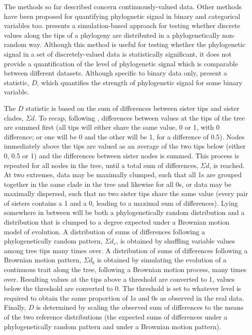 The methods so far described concern continuously-valued data. Other methods have been proposed for quantifying phylognetic signal in binary and categorical variables too. \textcite{abouheif_method_1999} presents a simulation-based approach for testing whether discrete values along the tips of a phylogeny are distributed in a phylogenetically non-random way. Although this method is useful for testing whether the phylogenetic signal in a set of discretely-valued data is statistically significant, it does not provide a quantification of the level of phylogenetic signal which is comparable between different datasets. Although specific to binary data only, \textcite{fritz_selectivity_2010} present a statistic, \(D\), which quantifies the strength of phylogenetic signal for some binary variable.

The \(D\) statistic is based on the sum of differences between sister tips and sister clades, \(\Sigma d\). To recap, following \textcite{fritz_selectivity_2010}, differences between values at the tips of the tree are summed first (all tips will either share the same value, 0 or 1, with 0 difference; or one will be 0 and the other will be 1, for a difference of 0.5). Nodes immediately above the tips are valued as an average of the two tips below (either 0, 0.5 or 1) and the differences between sister nodes is summed. This process is repeated for all nodes in the tree, until a total sum of differences, \(\Sigma d\), is reached. At two extremes, data may be maximally clumped, such that all 1s are grouped together in the same clade in the tree and likewise for all 0s, or data may be maximally dispersed, such that no two sister tips share the same value (every pair of sisters contains a 1 and a 0, leading to a maximal sum of differences). Lying somewhere in between will be both a phylogenetically random distribution and a distribution that is clumped to a degree expected under a Brownian motion model of evolution. A distribution of sums of differences following a phylogenetically random pattern, \(\Sigma d_r\), is obtained by shuffling variable values among tree tips many times over. A distribution of sums of differences following a Brownian motion pattern, \(\Sigma d_b\) is obtained by simulating the evolution of a continuous trait along the tree, following a Brownian motion process, many times over. Resulting values at the tips above a threshold are converted to 1, values below the threshold are converted to 0. The threshold is set to whatever level is required to obtain the same proportion of 1s and 0s as observed in the real data. Finally, \(D\) is determined by scaling the observed sum of differences to the means of the two reference distributions (the expected sums of differences under a phylogenetically random pattern and under a Brownian motion pattern).

